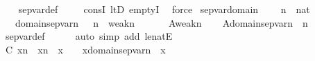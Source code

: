\begin{isabellebody}
%
\isadelimproof
\ \ %
\endisadelimproof
%
\isatagproof
{}\isamarkupfalse%
\ sep{\isacharunderscore}{\kern0pt}var{\isacharunderscore}{\kern0pt}def\ \isanewline
\ \ \isamarkupfalse%
\ consI\ ltD\ emptyI\ \isamarkupfalse%
\ force%
\endisatagproof
{\isafoldproof}%
%
\isadelimproof
\isanewline
%
\endisadelimproof
\isanewline
{}\isamarkupfalse%
\ sep{\isacharunderscore}{\kern0pt}var{\isacharunderscore}{\kern0pt}domain\ {\isacharcolon}{\kern0pt}\isanewline
\ \ \ {\isachardoublequoteopen}n\ {\isasymin}\ nat{\isachardoublequoteclose}\isanewline
\ \ \ {\isachardoublequoteopen}domain{\isacharparenleft}{\kern0pt}sep{\isacharunderscore}{\kern0pt}var{\isacharparenleft}{\kern0pt}n{\isacharparenright}{\kern0pt}{\isacharparenright}{\kern0pt}\ {\isacharequal}{\kern0pt}\ \ {}{\isacharhash}{\kern0pt}{\isacharplus}{\kern0pt}n\ {\isacharminus}{\kern0pt}\ weak{\isacharparenleft}{\kern0pt}n{\isacharcomma}{\kern0pt}{}{\isacharparenright}{\kern0pt}{\isachardoublequoteclose}\isanewline
%
\isadelimproof
%
\endisadelimproof
%
\isatagproof
{}\isamarkupfalse%
\ {\isacharminus}{\kern0pt}\ \isanewline
\ \ \isamarkupfalse%
\ {\isacharquery}{\kern0pt}A{\isacharequal}{\kern0pt}{\isachardoublequoteopen}weak{\isacharparenleft}{\kern0pt}n{\isacharcomma}{\kern0pt}{}{\isacharparenright}{\kern0pt}{\isachardoublequoteclose}\isanewline
\ \ \isamarkupfalse%
\ A{\isacharcolon}{\kern0pt}{\isachardoublequoteopen}domain{\isacharparenleft}{\kern0pt}sep{\isacharunderscore}{\kern0pt}var{\isacharparenleft}{\kern0pt}n{\isacharparenright}{\kern0pt}{\isacharparenright}{\kern0pt}\ {\isasymsubseteq}\ {\isacharparenleft}{\kern0pt}{}{\isacharhash}{\kern0pt}{\isacharplus}{\kern0pt}n{\isacharparenright}{\kern0pt}{\isachardoublequoteclose}\ \isanewline
\ \ \ \ \isamarkupfalse%
\ sep{\isacharunderscore}{\kern0pt}var{\isacharunderscore}{\kern0pt}def\ \isanewline
\ \ \ \ \isamarkupfalse%
{\isacharparenleft}{\kern0pt}auto\ simp\ add{\isacharcolon}{\kern0pt}\ le{\isacharunderscore}{\kern0pt}natE{\isacharparenright}{\kern0pt}\isanewline
\ \ \isamarkupfalse%
\ C{\isacharcolon}{\kern0pt}\ {\isachardoublequoteopen}x{\isacharequal}{\kern0pt}{}{\isacharhash}{\kern0pt}{\isacharplus}{\kern0pt}n\ {\isasymor}\ x{\isacharequal}{\kern0pt}{}{\isacharhash}{\kern0pt}{\isacharplus}{\kern0pt}n\ {\isasymor}\ x\ {\isasymle}\ {}{\isachardoublequoteclose}\ \ {\isachardoublequoteopen}x{\isasymin}domain{\isacharparenleft}{\kern0pt}sep{\isacharunderscore}{\kern0pt}var{\isacharparenleft}{\kern0pt}n{\isacharparenright}{\kern0pt}{\isacharparenright}{\kern0pt}{\isachardoublequoteclose}\ \ x\isanewline

\end{isabellebody}
